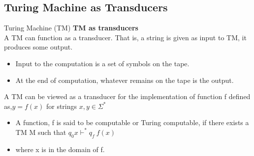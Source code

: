 \documentclass{beamer}
\begin{document}
\subsection{Turing Machine as Transducers}
\begin{frame}{Turing Machine (TM)}
\textbf{TM as transducers}\\
A TM can function as a transducer. That is, a string is given as input to TM, it produces some output.
\begin{itemize}
	\item Input to the computation is a set of symbols on the tape.
	\item At the end of computation, whatever remains on the tape is the output.
\end{itemize}
A TM can be viewed as a transducer for the implementation of function f defined as,$y=f(x)$ for strings $x, y\in \Sigma^*$
\begin{itemize}
	\item A function, f is said to be computable or Turing computable, if there exists a TM M such that $q_0 x \vdash^* q_f\  f(x)$
	\item where x is in the domain of f.
\end{itemize}
\end{frame}	
\end{document}
